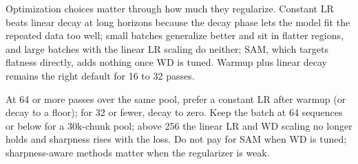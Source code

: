  Optimization choices matter through how much they regularize. Constant LR beats linear decay at long horizons because the decay phase lets the model fit the repeated data too well; small batches generalize better and sit in flatter regions, and large batches with the linear LR scaling do neither; SAM, which targets flatness directly, adds nothing once WD is tuned. Warmup plus linear decay remains the right default for 16 to 32 passes.

 At 64 or more passes over the same pool, prefer a constant LR after warmup (or decay to a floor); for 32 or fewer, decay to zero. Keep the batch at 64 sequences or below for a 30k-chunk pool; above 256 the linear LR and WD scaling no longer holds and sharpness rises with the loss. Do not pay for SAM when WD is tuned; sharpness-aware methods matter when the regularizer is weak.
